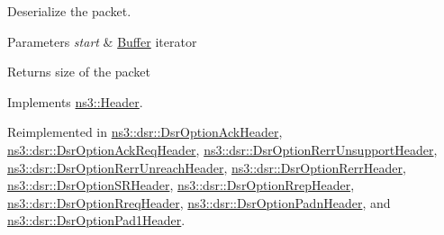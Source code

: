 Deserialize the packet. 


\begin{DoxyParams}{Parameters}
{\em start} & \hyperlink{classns3_1_1Buffer}{Buffer} iterator \\
\hline
\end{DoxyParams}
\begin{DoxyReturn}{Returns}
size of the packet 
\end{DoxyReturn}


Implements \hyperlink{classns3_1_1Header_a78be9400bb66b2a8543606f395ef5396}{ns3\+::\+Header}.



Reimplemented in \hyperlink{classns3_1_1dsr_1_1DsrOptionAckHeader_a0c7f637f03ac2f48cfabfd8f18671a39}{ns3\+::dsr\+::\+Dsr\+Option\+Ack\+Header}, \hyperlink{classns3_1_1dsr_1_1DsrOptionAckReqHeader_a5c7c9641d41346faf881a4d7df0f36c7}{ns3\+::dsr\+::\+Dsr\+Option\+Ack\+Req\+Header}, \hyperlink{classns3_1_1dsr_1_1DsrOptionRerrUnsupportHeader_ad568e52cacee0c67a43338e8838806a5}{ns3\+::dsr\+::\+Dsr\+Option\+Rerr\+Unsupport\+Header}, \hyperlink{classns3_1_1dsr_1_1DsrOptionRerrUnreachHeader_ab6cda2c6108b5a5076941b7f541ef320}{ns3\+::dsr\+::\+Dsr\+Option\+Rerr\+Unreach\+Header}, \hyperlink{classns3_1_1dsr_1_1DsrOptionRerrHeader_ab8bc84d5e10a371524ed37035db5dbec}{ns3\+::dsr\+::\+Dsr\+Option\+Rerr\+Header}, \hyperlink{classns3_1_1dsr_1_1DsrOptionSRHeader_a83a9b996c0be40f74b61f8b56f82330e}{ns3\+::dsr\+::\+Dsr\+Option\+S\+R\+Header}, \hyperlink{classns3_1_1dsr_1_1DsrOptionRrepHeader_a712214d2e33913f631092ddaccfdb774}{ns3\+::dsr\+::\+Dsr\+Option\+Rrep\+Header}, \hyperlink{classns3_1_1dsr_1_1DsrOptionRreqHeader_a7cf6a4240408c554fe4ca6ea9b266651}{ns3\+::dsr\+::\+Dsr\+Option\+Rreq\+Header}, \hyperlink{classns3_1_1dsr_1_1DsrOptionPadnHeader_aba1dc34ff93da84dc1a9db15134cd140}{ns3\+::dsr\+::\+Dsr\+Option\+Padn\+Header}, and \hyperlink{classns3_1_1dsr_1_1DsrOptionPad1Header_ab040965b45b9e8d3485110e5dba1894f}{ns3\+::dsr\+::\+Dsr\+Option\+Pad1\+Header}.


